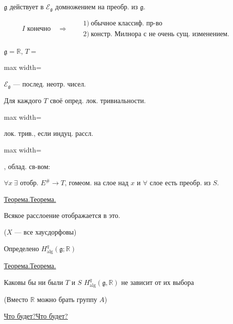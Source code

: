 \documentclass[11pt]{article}
\theoremstyle{definition}
\theoremstyle{remark}
\let\DiplomaticMathUnderline\underline
\renewcommand{\underline}[1]{\ifmmode\DiplomaticMathUnderline{#1}\else\uline{#1}\fi}
\begin{document}
$\mathfrak g$ действует в $\mathcal E_{\mathfrak g}$ домножением на преобр. из $\mathfrak g$.

\begin{equation*}
I\text{ конечно}\quad\Rightarrow\quad
\begin{aligned}
&1)\ \text{обычное классиф. пр-во}\\
&2)\ \text{констр. Милнора с не очень сущ. изменением.}
\end{aligned}
\end{equation*}

$\mathfrak g=\mathbb R$, $T={}$
\begin{adjustbox}{max width=\linewidth}
\end{adjustbox}
\qquad $\mathcal E_{\mathfrak g}$ — послед. неотр. чисел.

Для каждого $T$ своё опред. лок. тривиальности.

\begin{adjustbox}{max width=\linewidth}
\end{adjustbox}
лок. трив., если индуц. рассл.
\begin{adjustbox}{max width=\linewidth}
\end{adjustbox}, облад. св-вом:

$\forall x\ \exists$ отобр. $E^{\#}\longrightarrow T$, гомеом. на слое над $x$ и
$\forall$ слое есть преобр. из $S$.

\underline{Теорема.}

Всякое расслоение отображается в это.

($X$ — все хаусдорфовы)

Определено $H^q_{\mathrm{alg}}(\mathfrak g;\mathbb R)$

\underline{Теорема.}

Каковы бы ни были $T$ и $S$ $H^q_{\mathrm{alg}}(\mathfrak g,\mathbb R)$
не зависит от их выбора

(Вместо $\mathbb R$ можно брать группу $A$)

\underline{Что будет?}
\end{document}
